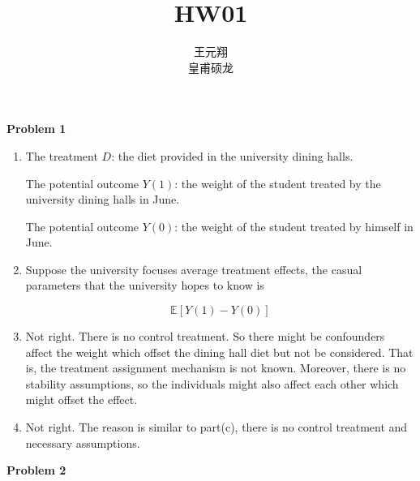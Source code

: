 \documentclass{notes}
\title{HW01}
\author{王元翔\;2022311937\\皇甫硕龙\;2022311931}
\begin{document}
	\maketitle
	\noindent\textbf{Problem 1}

	\begin{enumerate}[label=\textbf{(\alph*)}]
		\item The treatment $D$: the diet provided in the university dining halls.

		The potential outcome $Y(1)$: the weight of the student treated by the university dining halls in June.

		The potential outcome $Y(0)$: the weight of the student treated by himself in June.
		\item Suppose the university focuses average treatment effects, the casual parameters that the university hopes to know is

		\begin{equation}
			\mathbb{E}[Y(1)-Y(0)]
		\end{equation}
		\item Not right. There is no control treatment. So there might be confounders affect the weight which offset the dining hall diet but not be considered. That is, the treatment assignment mechanism is not known. Moreover, there is no stability assumptions, so the individuals might also affect each other which might offset the effect.
		\item Not right. The reason is similar to part(c), there is no control treatment and necessary assumptions.
	\end{enumerate}

	\noindent\textbf{Problem 2}
\end{document}
